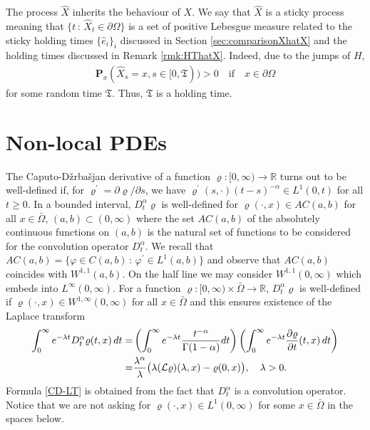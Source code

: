 \documentclass[11pt,a4paper]{article}
\begin{document}
The process $\hat{X}$ inherits the behaviour of $X$. We say that $\hat{X}$ is a sticky process meaning that $\{t\,:\, \hat{X}_t \in \partial \Omega\}$ is a set of positive Lebesgue measure related to the sticky holding times $\{\hat{e}_i\}_i$ discussed in Section \ref{sec:comparisonXhatX} and the holding times discussed in Remark \ref{rmk:HThatX}. Indeed, due to the jumps of $H$,  
\begin{align*}
\mathbf{P}_x(\hat{X}_s = x, s \in [0,\mathfrak{T}))>0 \quad \textrm{if} \quad x \in \partial \Omega
\end{align*}
for some random time $\mathfrak{T}$. Thus, $\mathfrak{T}$ is a holding time.






\section{Non-local PDEs}


The Caputo-D\v{z}rba\v{s}jan derivative of a function $\varrho: [0, \infty) \to \mathbb{R}$ turns out to be well-defined if, for $\varrho^\prime = \partial \varrho/\partial s$, we have $\varrho^\prime(s, \cdot) (t-s)^{-\alpha} \in L^1(0,t)$ for all $t \geq 0$. In a bounded interval, $D^\alpha_t \varrho$ is well-defined for $\varrho(\cdot, x) \in AC(a,b)$ for all $x \in \bar{\Omega}$, $(a,b) \subset (0, \infty)$ where the set $AC(a,b)$ of the absolutely continuous functions on $(a,b)$ is the natural set of functions to be considered for the convolution operator $D^\alpha_t$. We recall that $AC(a,b) = \{\varphi \in C(a, b)\,:\, \varphi^\prime \in L^1(a,b)\}$ and observe that $AC(a,b)$ coincides with $W^{1,1}(a,b)$.  On the half line we may consider $W^{1,1}(0,\infty)$ which embeds into $L^\infty(0,\infty)$. For a function $\varrho : [0, \infty) \times \bar{\Omega} \to \mathbb{R}$, $D^\alpha_t \varrho$ is well-defined if $\varrho(\cdot, x) \in W^{1,\infty} (0,\infty)$ for all $x \in \bar{\Omega}$ and this ensures existence of the Laplace transform
\begin{align}
\int_0^\infty e^{-\lambda t} D^\alpha_t \varrho(t,x)\, dt 
= & \left( \int_0^\infty e^{-\lambda t} \frac{t^{-\alpha}}{\Gamma(1-\alpha)}dt \right) \left(\int_0^\infty e^{-\lambda t} \frac{\partial \varrho}{\partial t}(t,x) \, dt \right)\notag \\ 
= & \frac{\lambda^\alpha}{\lambda} \big(\lambda (\mathcal{L}\varrho)(\lambda, x) - \varrho(0, x) \big), \quad \lambda>0.
\label{CD-LT}
\end{align}
Formula \eqref{CD-LT} is obtained from the fact that $D^\alpha_t$ is a convolution operator. Notice that we are not asking for $\varrho(\cdot, x) \in L^1(0, \infty)$ for some $x \in \bar{\Omega}$ in the spaces below.\\
\end{document}
